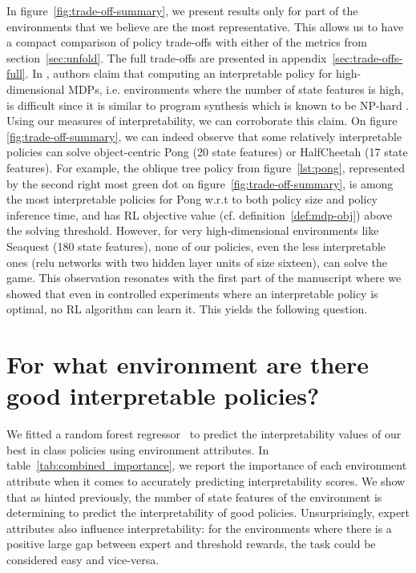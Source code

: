 In figure~\ref{fig:trade-off-summary}, we present results only for part of the environments that we believe are the most representative.
This allows us to have a compact comparison of policy trade-offs with either of the metrics from section~\ref{sec:unfold}.
The full trade-offs are presented in appendix~\ref{sec:trade-offs-full}.
In \cite{glanois-survey}, authors claim that computing an interpretable policy for high-dimensional MDPs, i.e. environments where the number of state features is high, is difficult since it is similar to program synthesis which is known to be NP-hard \cite{program-synth}.
Using our measures of interpretability, we can corroborate this claim.
On figure \ref{fig:trade-off-summary}, we can indeed observe that some relatively interpretable policies can solve object-centric Pong (20 state features) or HalfCheetah (17 state features). 
For example, the oblique tree policy from figure~\ref{lst:pong}, represented by the second right most green dot on figure~\ref{fig:trade-off-summary}, is among the most interpretable policies for Pong w.r.t to both policy size and policy inference time, and has RL objective value (cf. definition~\ref{def:mdp-obj}) above the solving threshold.  
However, for very high-dimensional environments like Seaquest (180 state features), none of our policies, even the less interpretable ones (relu networks with two hidden layer units of size sixteen), can solve the game.
This observation resonates with the first part of the manuscript where we showed that even in controlled experiments where an interpretable policy is optimal, no RL algorithm can learn it.
This yields the following question.

\section{For what environment are there good interpretable policies?}
We fitted a random forest regressor~\cite{random} to predict the interpretability values of our best in class policies using environment attributes. 
In table~\ref{tab:combined_importance}, we report the importance of each environment attribute when it comes to accurately predicting interpretability scores.
We show that as hinted previously, the number of state features of the environment is determining to predict the interpretability of good policies.
Unsurprisingly, expert attributes also influence interpretability: for the environments where there is a positive large gap between expert and threshold rewards, the task could be considered easy and vice-versa.

